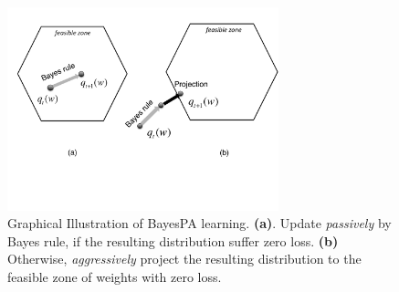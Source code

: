 \documentclass[twoside,11pt]{article}
\begin{document}
\begin{figure}[t]
\begin{center}
\includegraphics[width=0.7\textwidth]{pa.pdf}
\end{center}\vspace{-.3cm}
\caption{Graphical Illustration of BayesPA learning. \textbf{(a)}. Update \emph{passively} by Bayes rule, if the resulting distribution suffer zero loss. \textbf{(b)} Otherwise, \emph{aggressively} project the resulting distribution to the feasible zone of weights with zero loss. }\label{fig:bayesPA}\vspace{-.3cm}
\end{figure}
\end{document}
